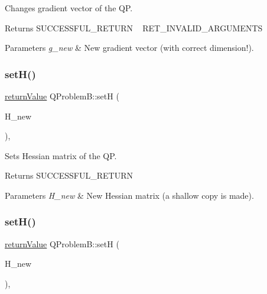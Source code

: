 Changes gradient vector of the QP. \begin{DoxyReturn}{Returns}
S\+U\+C\+C\+E\+S\+S\+F\+U\+L\+\_\+\+R\+E\+T\+U\+RN ~\newline
 R\+E\+T\+\_\+\+I\+N\+V\+A\+L\+I\+D\+\_\+\+A\+R\+G\+U\+M\+E\+N\+TS 
\end{DoxyReturn}

\begin{DoxyParams}{Parameters}
{\em g\+\_\+new} & New gradient vector (with correct dimension!). \\
\hline
\end{DoxyParams}
\mbox{\label{class_q_problem_b_ac9ca851c00d04f7f052a306f0f9f74ce}} 
\subsubsection{\texorpdfstring{set\+H()}{setH()}\hspace{0.1cm}{\footnotesize\ttfamily [1/2]}}
{\footnotesize\ttfamily \hyperlink{_message_handling_8hpp_a81d556f613bfbabd0b1f9488c0fa865e}{return\+Value} Q\+Problem\+B\+::setH (\begin{DoxyParamCaption}\item[{\hyperlink{class_symmetric_matrix}{Symmetric\+Matrix} $\ast$}]{H\+\_\+new }\end{DoxyParamCaption})\hspace{0.3cm}{\ttfamily [inline]}, {\ttfamily [protected]}}

Sets Hessian matrix of the QP. \begin{DoxyReturn}{Returns}
S\+U\+C\+C\+E\+S\+S\+F\+U\+L\+\_\+\+R\+E\+T\+U\+RN 
\end{DoxyReturn}

\begin{DoxyParams}{Parameters}
{\em H\+\_\+new} & New Hessian matrix (a shallow copy is made). \\
\hline
\end{DoxyParams}
\mbox{\label{class_q_problem_b_a5cb41e48d8508f561324a3b2c8155755}} 
\subsubsection{\texorpdfstring{set\+H()}{setH()}\hspace{0.1cm}{\footnotesize\ttfamily [2/2]}}
{\footnotesize\ttfamily \hyperlink{_message_handling_8hpp_a81d556f613bfbabd0b1f9488c0fa865e}{return\+Value} Q\+Problem\+B\+::setH (\begin{DoxyParamCaption}\item[{const \hyperlink{qp_o_a_s_e_s__wrapper_8h_a0d00e2b3dfadee81331bbb39068570c4}{real\+\_\+t} $\ast$const}]{H\+\_\+new }\end{DoxyParamCaption})\hspace{0.3cm}{\ttfamily [inline]}, {\ttfamily [protected]}}

